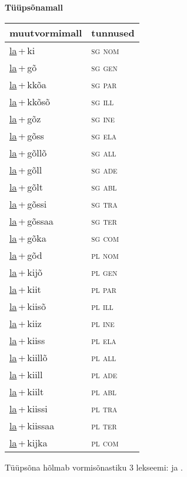 
\vspace{1.8em}
\begin{minipage}{\textwidth}
\textbf{Tüüpsõnamall \,}\\

\begin{sideways}
\begin{tabular}{l l}
muutvormimall & tunnused \\
\hline
\underline{la}\,+\,ki & \textsc{ sg nom } \\
\underline{la}\,+\,gõ & \textsc{ sg gen } \\
\underline{la}\,+\,kkõa & \textsc{ sg par } \\
\underline{la}\,+\,kkõsõ & \textsc{ sg ill } \\
\underline{la}\,+\,gõz & \textsc{ sg ine } \\
\underline{la}\,+\,gõss & \textsc{ sg ela } \\
\underline{la}\,+\,gõllõ & \textsc{ sg all } \\
\underline{la}\,+\,gõll & \textsc{ sg ade } \\
\underline{la}\,+\,gõlt & \textsc{ sg abl } \\
\underline{la}\,+\,gõssi & \textsc{ sg tra } \\
\underline{la}\,+\,gõssaa & \textsc{ sg ter } \\
\underline{la}\,+\,gõka & \textsc{ sg com } \\
\underline{la}\,+\,gõd & \textsc{ pl nom } \\
\underline{la}\,+\,kijõ & \textsc{ pl gen } \\
\underline{la}\,+\,kiit & \textsc{ pl par } \\
\underline{la}\,+\,kiisõ & \textsc{ pl ill } \\
\underline{la}\,+\,kiiz & \textsc{ pl ine } \\
\underline{la}\,+\,kiiss & \textsc{ pl ela } \\
\underline{la}\,+\,kiillõ & \textsc{ pl all } \\
\underline{la}\,+\,kiill & \textsc{ pl ade } \\
\underline{la}\,+\,kiilt & \textsc{ pl abl } \\
\underline{la}\,+\,kiissi & \textsc{ pl tra } \\
\underline{la}\,+\,kiissaa & \textsc{ pl ter } \\
\underline{la}\,+\,kijka & \textsc{ pl com } \\
\end{tabular}
\end{sideways}
\label{tab:tüüpsõnamall-laki}

\end{minipage}

 
\vspace{1em}
\noindent Tüüpsõna hõlmab vormisõnastiku 3 lekseemi:  ja .
